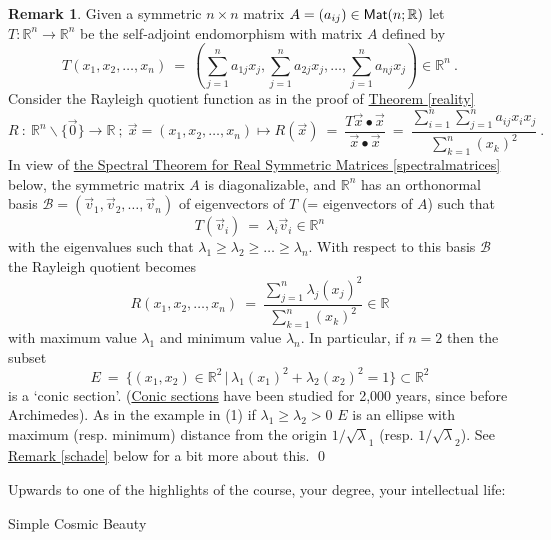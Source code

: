 \documentclass[11pt]{amsbook}
\def\RR{{\mathbb R}}
\theoremstyle{definition}
\newtheorem{rem}[theorem]{Remark}
\begin{document}
\begin{rem}
Given a symmetric $n \times n$ matrix $A=(a_{ij}) \in {\sf Mat}(n;\RR)$ let $T:\RR^n \to \RR^n$ be the self-adjoint endomorphism with matrix $A$ defined by
$$T(x_1,x_2,\dots,x_n)~=~(\sum\limits^n_{j=1}a_{1j}x_j,\sum\limits^n_{j=1}a_{2j}x_j,\dots,\sum\limits^n_{j=1}a_{nj}x_j) \in \RR^n~.$$
Consider the Rayleigh quotient function as in the proof of \hyperref[reality]{Theorem \ref{reality}}
$$R~:~\RR^n\backslash \{\vec{0}\} \to \RR~;~\vec{x}=(x_1,x_2,\dots,x_n) \mapsto
R(\vec{x})~=~
\dfrac{T\vec{x} \bullet\vec{x}}{\vec{x} \bullet \vec{x}}~=~
\dfrac{\sum\limits^n_{i=1}\sum\limits^n_{j=1}a_{ij}x_ix_j}{\sum\limits^n_{k=1}(x_k)^2}~.$$
In view of \hyperref[spectralmatrices]{the Spectral Theorem for Real Symmetric Matrices \ref{spectralmatrices}} below, the symmetric matrix $A$ is diagonalizable, and $\RR^n$ has an orthonormal basis ${\mathcal B}=(\vec{v}_1,\vec{v}_2,\dots,\vec{v}_n)$ of eigenvectors of $T$ (= eigenvectors of $A$) such that
$$T(\vec{v}_i)~=~\lambda_i \vec{v}_i \in \RR^n$$
with the eigenvalues such that $\lambda_1 \geqslant \lambda_2 \geqslant \dots \geqslant \lambda_n$. With respect to this basis $\mathcal{B}$ the Rayleigh quotient becomes
$$R(x_1,x_2,\dots,x_n)~=~\dfrac{\sum\limits^n_{j=1}\lambda_j(x_j)^2}{\sum\limits^n_{k=1}(x_k)^2} \in \RR$$
with maximum value $\lambda_1$ and minimum value $\lambda_n$. In particular, if $n=2$
then the subset
$$E~=~\{(x_1,x_2) \in \RR^2\,\vert\,\lambda_1 (x_1)^2+\lambda_2(x_2)^2=1\} \subset \RR^2$$
is a 	`conic section'. (\href{http://en.wikipedia.org/wiki/Conic_section}{Conic sections} have been studied for 2,000 years, since before Archimedes). As in the example in (1) if $\lambda_1 \geqslant \lambda_2 >0$ $E$ is an ellipse
with maximum (resp. minimum) distance from the origin $1/\sqrt{\lambda}_1$ (resp. $1/\sqrt{\lambda}_2$). See \hyperref[schade]{Remark \ref{schade}} below for a bit more about this.
\hfill\qed
\end{rem}

Upwards to one of the highlights of the course, your degree, your intellectual life:
\medskip

\begin{center}Simple Cosmic Beauty\end{center}
\medskip
\end{document}
